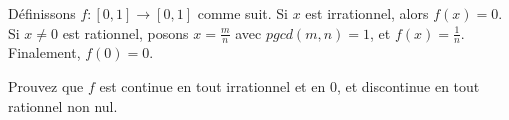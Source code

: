 
\begin{exercice}\label{exo0038}

Définissons $f\colon [0,1]\to [0,1]$ comme suit. Si $x$ est irrationnel, alors $f(x)=0$. Si $x\not=0$ est rationnel, posons $x=\frac{m}{n}$ avec $pgcd(m,n)=1$, et $f(x)=\frac{1}{n}$. Finalement, $f(0)=0$.

Prouvez que $f$ est continue en tout irrationnel et en $0$, et discontinue en tout rationnel non nul.

\end{exercice}
